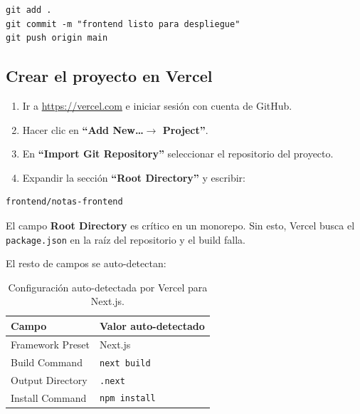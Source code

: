 \documentclass[12pt, a4paper]{article}
\newcommand{\cmd}[1]{\texttt{#1}}
\begin{document}
\begin{lstlisting}[style=bash]
git add .
git commit -m "frontend listo para despliegue"
git push origin main
\end{lstlisting}

\subsection{Crear el proyecto en Vercel}

\begin{enumerate}
    \item Ir a \url{https://vercel.com} e iniciar sesión con cuenta de GitHub.
    \item Hacer clic en \textbf{``Add New\ldots $\rightarrow$ Project''}.
    \item En \textbf{``Import Git Repository''} seleccionar el repositorio del proyecto.
    \item Expandir la sección \textbf{``Root Directory''} y escribir:
\end{enumerate}

\begin{lstlisting}[style=texto]
frontend/notas-frontend
\end{lstlisting}

\begin{importante}
    El campo \textbf{Root Directory} es crítico en un monorepo. Sin esto, Vercel busca el \cmd{package.json} en la raíz del repositorio y el build falla.
\end{importante}

El resto de campos se auto-detectan:

\begin{table}[H]
    \centering
    \begin{tabular}{ll}
        \toprule
        \textbf{Campo} & \textbf{Valor auto-detectado} \\
        \midrule
        Framework Preset & Next.js \\
        Build Command    & \cmd{next build} \\
        Output Directory & \cmd{.next} \\
        Install Command  & \cmd{npm install} \\
        \bottomrule
    \end{tabular}
    \caption{Configuración auto-detectada por Vercel para Next.js.}
\end{table}
\end{document}
